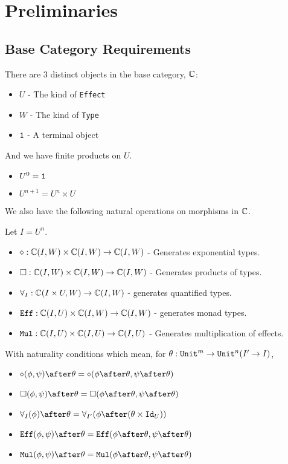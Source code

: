 \documentclass{report}
\newcommand{\allI}[0]{\forall_I}
\newcommand{\allII}[0]{\forall_{I'}}
\newcommand\type[0]{\texttt{Type}}
\newcommand\effect[0]{\texttt{Effect}}
\newcommand\ciw[0]{\C(I, W)}
\newcommand\ciu[0]{\C(I, U)}
\newcommand\ciuw[0]{\C(I\times U, W)}
\newcommand\Eff[0]{\texttt{Eff}}
\newcommand\Mul[0]{\texttt{Mul}}
\begin{document}
\tableofcontents
\chapter{Preliminaries}
\section{Base Category Requirements}
There are 3 distinct objects in the base category, $\mathbb{C}$:

\begin{itemize}
    \item $U$ - The kind of \effect
    \item $W$ - The kind of \type
    \item $\texttt{1}$ - A terminal object
\end{itemize}

And we have finite products on $U$.

\begin{itemize}
    \item $U^0 = \texttt{1}$
    \item $U^{n+1} = U^n \times U$
\end{itemize}

We also have the following natural operations on morphisms in $\mathbb{C}$.

Let $I = U^n$.

\begin{itemize}
    \item $\diamond: \ciw \times \ciw \rightarrow \ciw$ - Generates exponential types.
    \item $\square: \ciw\times\ciw\rightarrow\ciw$ - Generates products of types.
    \item $\allI: \ciuw\rightarrow\ciw$ - generates quantified types.
    \item $\Eff:\ciu\times\ciw\rightarrow\ciw$ - generates monad types.
    \item $\Mul:\ciu\times\ciu\rightarrow\ciu$ - Generates multiplication of effects.
\end{itemize}

With naturality conditions which mean, for $\theta: \texttt{Unit}^m \rightarrow\texttt{Unit}^n (I' \rightarrow I)$,
\begin{itemize}
    \item $\diamond(\phi,\psi)\after\theta = \diamond(\phi\after\theta,\psi\after\theta)$
    \item $\square(\phi,\psi)\after\theta = \square(\phi\after\theta,\psi\after\theta)$
    \item $\allI(\phi)\after\theta = \allII(\phi\after(\theta\times\Id{U}))$
    \item $\Eff(\phi,\psi)\after\theta = \Eff(\phi\after\theta,\psi\after\theta)$
    \item $\Mul(\phi,\psi)\after\theta = \Mul(\phi\after\theta,\psi\after\theta)$
\end{itemize}
\end{document}

